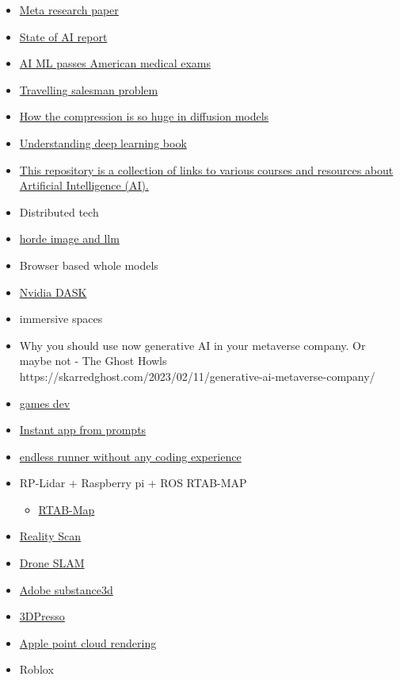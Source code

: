 \begin{itemize}
{  substack}
\item
  \href{https://drive.google.com/file/d/1i4NJKAggS82wqMamCJ1OHRGgViuyoY6R/view}{Meta
  research paper}
\item
  \href{https://www.stateof.ai/}{State of AI report}
\item
  \href{https://www.medpagetoday.com/special-reports/exclusives/102705}{AI
  ML passes American medical exams}
\item
  \href{https://github.com/diego-vicente/som-tsp}{Travelling salesman
  problem}
\item
  \href{https://medium.com/@socialemail/how-diffusion-models-can-achieve-seemingly-arbitrarily-large-compression-ratios-through-learning-2b21a317a46a}{How
  the compression is so huge in diffusion models}
\item
  \href{https://udlbook.github.io/udlbook/}{Understanding deep learning
  book}
\item
  \href{https://github.com/SkalskiP/courses}{This repository is a
  collection of links to various courses and resources about Artificial
  Intelligence (AI).}
\item
  Distributed tech
\item
  \href{https://horde.koboldai.net/}{horde image and llm}
\item
  Browser based whole models
\item
  \href{https://developer.nvidia.com/blog/dask-tutorial-beginners-guide-to-distributed-computing-with-gpus-in-python/}{Nvidia
  DASK}
\item
  immersive spaces
\item
  Why you should use now generative AI in your metaverse company. Or
  maybe not - The Ghost Howls
  https://skarredghost.com/2023/02/11/generative-ai-metaverse-company/
\item
  \href{https://www.traffickinggame.com/ai-assisted-graphics/}{games
  dev}
\item
  \href{https://twitter.com/ronithhh/status/1641318606549176321}{Instant
  app from prompts}
\item
  \href{https://replit.com/@asrsubs/SkyRoads-GPT-4}{endless runner
  without any coding experience}
\item
  RP-Lidar + Raspberry pi + ROS RTAB-MAP

  \begin{itemize}
   
  \item
    \href{http://introlab.github.io/rtabmap/}{RTAB-Map}
  \end{itemize}
\item
  \href{https://www.unrealengine.com/en-US/blog/realityscan-is-now-free-to-download-on-ios}{Reality
  Scan}
\item
  \href{https://www.youtube.com/watch?v=CEC5UwPV9gY}{Drone SLAM}
\item
  \href{https://www.substance3d.com/}{Adobe substance3d}
\item
  \href{https://3dpresso.ai/viewer?seq=mr3.yg5isic8KGJZ1DAjW5VMc}{3DPresso}
\item
  \href{https://machinelearning.apple.com/research/pointersect}{Apple
  point cloud rendering}
\item
  Roblox


\end{itemize}
